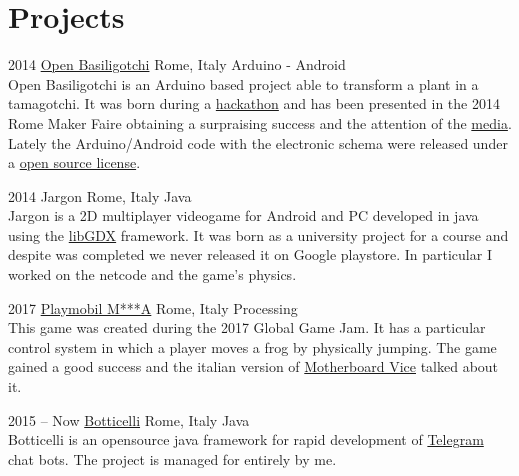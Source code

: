 \documentclass[]{friggeri-cv} %
\begin{document}

\section{Projects}

\begin{entrylist}


\entry
{2014}
{\href{https://www.facebook.com/Open-Basiligotchi-792468080818688/?rc=p}{Open Basiligotchi}}
{Rome, Italy}
{Arduino - Android\\
	Open Basiligotchi is an Arduino based project able to transform a plant in a tamagotchi. It was born during a \href{http://roma.startupitalia.eu/20041-20140331-basilico}{hackathon} and has been presented in the 2014 Rome Maker Faire obtaining a surpraising success and the attention of the \href{https://youtu.be/M7RPfu6zRww}{media}. Lately the Arduino/Android code with the electronic schema were released under a  \href{https://github.com/Jaeger87/OpenBasiligotchi}{open source license}.
}

\entry
{2014}
{Jargon}
{Rome, Italy}
{Java\\
	Jargon is a 2D multiplayer videogame for Android and PC developed in java using the \href{https://libgdx.badlogicgames.com/}{libGDX} framework.
	It was born as a university project for a course and despite was completed we never released it on Google playstore.
	In particular I worked on the netcode and the game's physics.	
}


\entry
{2017}
{\href{https://globalgamejam.org/2017/games/playmobil-ma}{Playmobil M***A}}
{Rome, Italy}
{Processing\\
	This game was created during the 2017 Global Game Jam. It has a particular control system in which a player moves a frog by physically jumping. The game gained a good success and the italian version of 
	\href{https://motherboard.vice.com/it/article/aejzz8/global-game-jam-2017-giochi-italiani}{Motherboard Vice} talked about it.
}



\entry
{2015 -- Now}
{\href{http://jaegerbox.net/botticelli-index/}{Botticelli}}
{Rome, Italy}
{Java\\
	Botticelli is an opensource java framework for rapid development of \href{https://telegram.org/}{Telegram} chat bots. The project is managed for entirely by me.	
}



\end{entrylist}
\end{document}
